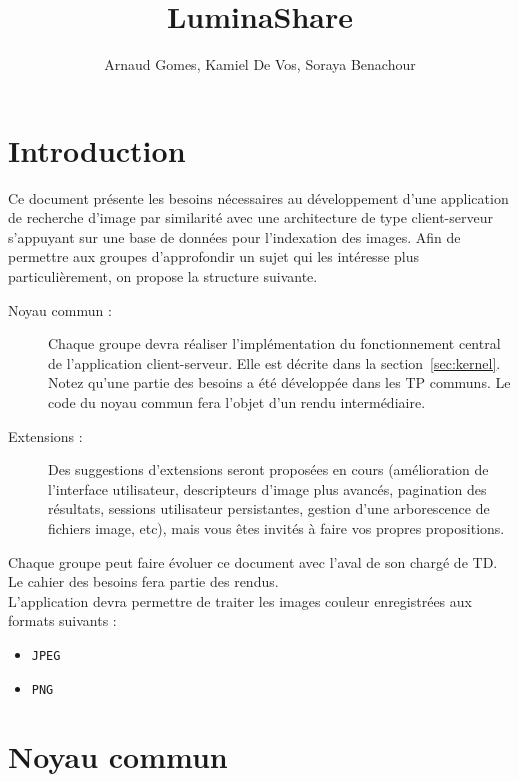 \documentclass[a4paper,12pt]{article}
\title{\sffamily \textbf{LuminaShare}}
\author{Arnaud Gomes, Kamiel De Vos, Soraya Benachour}
\date{}
\newcounter{besoin}
\begin{document}
\maketitle


\section{Introduction}

Ce document présente les besoins nécessaires au développement d'une application
de recherche d'image par similarité avec une architecture de type client-serveur s'appuyant sur une base de données pour l'indexation des images.
Afin de permettre aux groupes d'approfondir un sujet qui les intéresse plus
particulièrement, on propose la structure suivante.

\begin{description}
\item[Noyau commun :] Chaque groupe devra réaliser l'implémentation du fonctionnement central de l'application client-serveur. Elle est décrite dans la section~\ref{sec:kernel}. Notez qu'une partie des besoins a été développée dans les TP communs. Le code du noyau commun fera l'objet d'un rendu intermédiaire.
  
\item [Extensions :] Des suggestions d'extensions seront proposées en cours (amélioration de l'interface utilisateur, descripteurs d'image plus avancés, pagination des résultats, sessions utilisateur persistantes, gestion d'une arborescence de fichiers image, etc), mais vous êtes invités à faire vos propres propositions.
  
\end{description}


Chaque groupe peut faire évoluer ce document avec l'aval de son chargé de TD. Le cahier des besoins fera partie des rendus.\\


L'application devra permettre de traiter les images couleur enregistrées aux formats suivants :

\begin{itemize}
\item \verb!JPEG!
\item \verb!PNG!
\end{itemize}



\section{\label{sec:kernel}Noyau commun}
\end{document}
